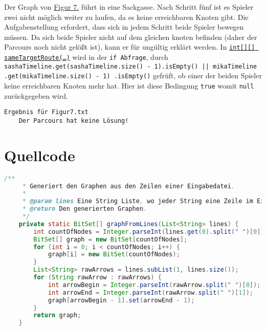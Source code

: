 \documentclass[a4paper,10pt,ngerman]{scrartcl}
\begin{document}
	Der Graph von \hyperref[fig:Figure7]{Figur 7.} führt in eine Sackgasse.
	Nach Schritt fünf ist es Spieler zwei nicht möglich weiter zu laufen, da es keine erreichbaren Knoten gibt.
	Die Aufgabenstellung erfordert, dass sich in jedem Schritt beide Spieler bewegen müssen.
	Da sich beide Spieler nicht auf dem gleichen knoten befinden (daher der Parcours noch nicht gelößt ist),
	kann er für ungültig erklärt werden.
	In \hyperref[lst:sameTargetRoute]{\texttt{int[][] sameTargetRoute(\ldots)}} wird in der \texttt{if Abfrage}, durch 
	\texttt{sashaTimeline.get(sashaTimeline.size() - 1).isEmpty() || mikaTimeline
    .get(mikaTimeline.size() - 1)
    .isEmpty()} gefrüft, ob einer der beiden Spieler keine erreichbaren Knoten mehr hat.
    Hier ist diese Bedingung \texttt{true} womit \texttt{null} zurückgegeben wird.
    
     \begin{lstlisting}[frame=single, title=Programmausgabe Figur 7., breaklines=true]
  Ergebnis für Figur7.txt
	Der Parcours hat keine Lösung!
    \end{lstlisting}

    \section{Quellcode}
    \label{sec:quellcode}
    \label{LastPage}
    \begin{lstlisting}[frame=single,language=Java,title=Methode graphFromLines,breaklines=true]
    /**
     * Generiert den Graphen aus den Zeilen einer Eingabedatei.
     *
     * @param lines Eine String Liste, wo jeder String eine Zeile im Eingabeformat ist.
     * @return Den generierten Graphen.
     */
    private static BitSet[] graphFromLines(List<String> lines) {
        int countOfNodes = Integer.parseInt(lines.get(0).split(" ")[0]);
        BitSet[] graph = new BitSet[countOfNodes];
        for (int i = 0; i < countOfNodes; i++) {
            graph[i] = new BitSet(countOfNodes);
        }
        List<String> rawArrows = lines.subList(1, lines.size());
        for (String rawArrow : rawArrows) {
            int arrowBegin = Integer.parseInt(rawArrow.split(" ")[0]);
            int arrowEnd = Integer.parseInt(rawArrow.split(" ")[1]);
            graph[arrowBegin - 1].set(arrowEnd - 1);
        }
        return graph;
    }
    \end{lstlisting}
\end{document}
